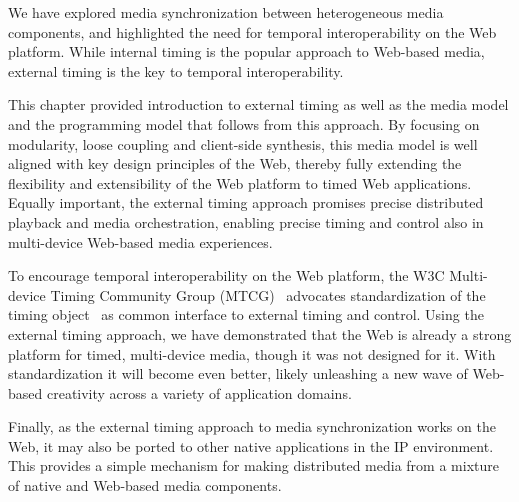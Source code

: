 We have explored media synchronization between heterogeneous media components,
and highlighted the need for temporal interoperability on the Web platform.
While internal timing is the popular approach to Web-based media, external
timing is the key to temporal interoperability.

This chapter provided introduction to external timing as well as the media
model and the programming model that follows from this approach. By focusing
on modularity, loose coupling and client-side synthesis, this media model is
well aligned with key design principles of the Web, thereby fully extending
the flexibility and extensibility of the Web platform to timed Web
applications. Equally important, the external timing approach promises
precise distributed playback and media orchestration, enabling precise timing
and control also in multi-device Web-based media experiences.

To encourage temporal interoperability on the Web platform, the W3C Multi-
device Timing Community Group (MTCG)~\cite{mtcg} advocates standardization of
the timing object~\cite{timingobject} as common interface to external timing
and control. Using the external timing approach, we have demonstrated that the
Web is already a strong platform for timed, multi-device media, though it was
not designed for it. With standardization it will become even better, likely
unleashing a new wave of Web-based creativity across a variety of application
domains.

Finally, as the external timing approach to media synchronization works on the
Web, it may also be ported to other native applications in the IP environment.
This provides a simple mechanism for making distributed media from a mixture
of native and Web-based media components.
